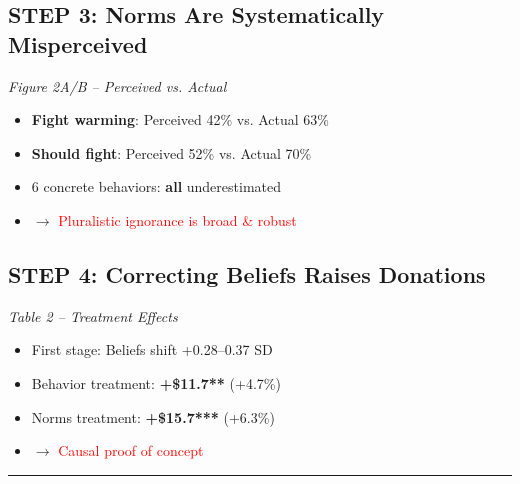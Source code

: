 \documentclass[10pt,a4paper]{article}
\begin{document}
\begin{minipage}[t]{0.48\textwidth}
\subsection*{STEP 3: Norms Are Systematically Misperceived}
\textit{Figure 2A/B -- Perceived vs. Actual}
\begin{itemize}[nosep]
    \item \textbf{Fight warming}: Perceived 42\% vs. Actual 63\%
    \item \textbf{Should fight}: Perceived 52\% vs. Actual 70\%
    \item 6 concrete behaviors: \textbf{all} underestimated
    \item $\rightarrow$ \textcolor{red}{Pluralistic ignorance is broad \& robust}
\end{itemize}
\end{minipage}
\hfill
\begin{minipage}[t]{0.48\textwidth}
\subsection*{STEP 4: Correcting Beliefs Raises Donations}
\textit{Table 2 -- Treatment Effects}
\begin{itemize}[nosep]
    \item First stage: Beliefs shift +0.28--0.37 SD
    \item Behavior treatment: \textbf{+\$11.7**} (+4.7\%)
    \item Norms treatment: \textbf{+\$15.7***} (+6.3\%)
    \item $\rightarrow$ \textcolor{red}{Causal proof of concept}
\end{itemize}
\end{minipage}

\vspace{8pt}
\hrule
\vspace{8pt}
\end{document}
